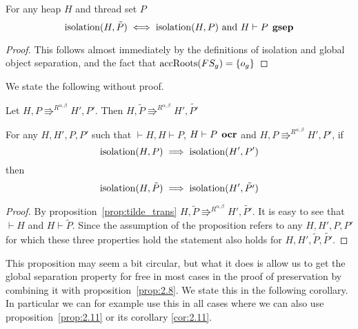 \begin{proposition} \label{prop:2.8}
  For any heap $H$ and thread set $P$
  \begin{equation*}
    \mbox{$\mathrm{isolation}$}{(H, \tilde{P})} \iff \mbox{$\mathrm{isolation}$}{(H, P)} \text{ and } H \vdash P
    \:\: \mbox{\bf gsep} 
  \end{equation*}
\end{proposition}

\begin{proof}
  This follows almost immediately by the definitions of isolation and global
  object separation, and the fact that $\mbox{$\mathrm{accRoots}$}(FS_g) = \left\{
    o_g \right\}$ 
\end{proof}

We state the following without proof.
\begin{proposition} \label{prop:tilde_trans}
  Let $H, P \Rrightarrow^{R^{\alpha, \beta}} H', P'$. Then $H, \tilde{P}
  \Rrightarrow^{R^{\alpha, \beta}} H', \tilde{P'}$
\end{proposition}

\begin{proposition} \label{prop:2.9}
  For any $H, H', P, P'$ such that $\vdash H, H \vdash P$, $H \vdash P \:\:
  \mbox{\bf ocr}$ and $H, P \Rrightarrow^{R^{\alpha, \beta}} H', P'$, if
  \begin{equation*}
      \mbox{$\mathrm{isolation}$}(H, P) 
      \implies 
      \mbox{$\mathrm{isolation}$}(H', P')
  \end{equation*}
  then
  \begin{equation*}
    \mbox{$\mathrm{isolation}$}(H, \tilde{P}) \implies \mbox{$\mathrm{isolation}$}(H', \tilde{P'})
  \end{equation*}
\end{proposition}

\begin{proof}
  By proposition~\ref{prop:tilde_trans} $H, \tilde{P} \Rrightarrow^{R^{\alpha,
  \beta}} H', \tilde{P'}$. It is easy to see that $\vdash H$ and $H \vdash
  \tilde{P}$.
  Since the assumption of the proposition refers to any $H, H', P, P'$ for which
  these three properties hold the statement also holds for $H, H',
  \tilde{P}, \tilde{P'}$.
\end{proof}

\begin{remark}
  This proposition may seem a bit circular, but what it does is allow us to get
  the global separation property for free in most cases in the proof of
  preservation by combining it with proposition~\ref{prop:2.8}. We state
  this in the following corollary. In particular we can for example use this in
  all cases where we can also use proposition~\ref{prop:2.11} or its corollary
  \ref{cor:2.11}.
\end{remark}

